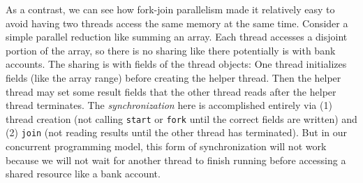 \documentclass[10pt]{article}
\begin{document}
As a contrast, we can see how fork-join parallelism made it relatively
easy to avoid having two threads access the same memory at the same
time.  Consider a simple parallel reduction like summing an array.
Each thread accesses a disjoint portion of the array, so there is no
sharing like there potentially is with bank accounts.  The
sharing is with fields of the thread objects: One thread initializes
fields (like the array range) before creating the helper thread.  Then
the helper thread may set some result fields that the other thread
reads after the helper thread terminates.  The \emph{synchronization}
here is accomplished entirely via (1) thread creation (not calling
{\tt start} or {\tt fork} until the correct fields are written) and
(2) {\tt join} (not reading results until the other thread has
terminated).  But in our concurrent programming model, this form of
synchronization will not work because we will not wait for another
thread to finish running before accessing a shared resource like a
bank account.
\end{document}
